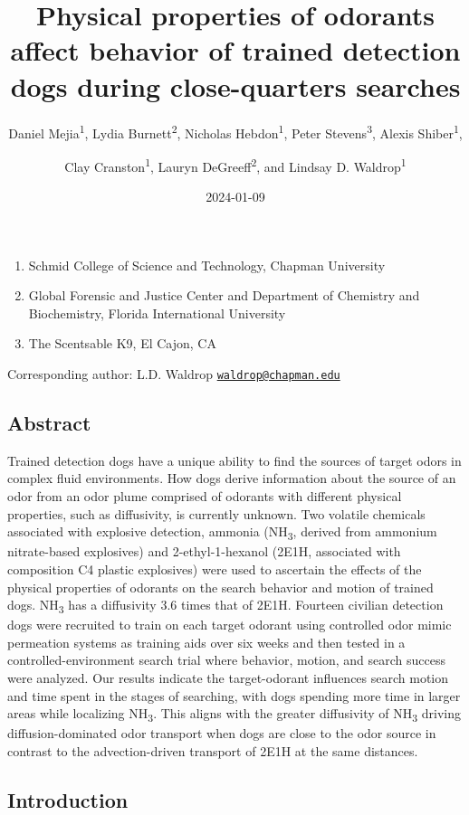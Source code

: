 \documentclass[
]{article}
\title{Physical properties of odorants affect behavior of trained detection dogs during close-quarters searches}
\author{Daniel Mejia\textsuperscript{1}, Lydia Burnett\textsuperscript{2}, Nicholas Hebdon\textsuperscript{1}, Peter Stevens\textsuperscript{3}, Alexis Shiber\textsuperscript{1}, \and Clay Cranston\textsuperscript{1}, Lauryn DeGreeff\textsuperscript{2}, and Lindsay D. Waldrop\textsuperscript{1}}
\date{2024-01-09}
\providecommand{\tightlist}{%
  \setlength{\itemsep}{0pt}\setlength{\parskip}{0pt}}
\begin{document}
\maketitle

\begin{enumerate}
\def\labelenumi{\arabic{enumi}.}
\tightlist
\item
  Schmid College of Science and Technology, Chapman University
\item
  Global Forensic and Justice Center and Department of Chemistry and Biochemistry, Florida International University
\item
  The Scentsable K9, El Cajon, CA
\end{enumerate}

Corresponding author: L.D. Waldrop \href{mailto:waldrop@chapman.edu}{\nolinkurl{waldrop@chapman.edu}}

\hypertarget{abstract}{%
\subsection{Abstract}\label{abstract}}

Trained detection dogs have a unique ability to find the sources of target odors in complex fluid environments. How dogs derive information about the source of an odor from an odor plume comprised of odorants with different physical properties, such as diffusivity, is currently unknown. Two volatile chemicals associated with explosive detection, ammonia (NH\textsubscript{3}, derived from ammonium nitrate-based explosives) and 2-ethyl-1-hexanol (2E1H, associated with composition C4 plastic explosives) were used to ascertain the effects of the physical properties of odorants on the search behavior and motion of trained dogs. NH\textsubscript{3} has a diffusivity 3.6 times that of 2E1H. Fourteen civilian detection dogs were recruited to train on each target odorant using controlled odor mimic permeation systems as training aids over six weeks and then tested in a controlled-environment search trial where behavior, motion, and search success were analyzed. Our results indicate the target-odorant influences search motion and time spent in the stages of searching, with dogs spending more time in larger areas while localizing NH\textsubscript{3}. This aligns with the greater diffusivity of NH\textsubscript{3} driving diffusion-dominated odor transport when dogs are close to the odor source in contrast to the advection-driven transport of 2E1H at the same distances.

\hypertarget{introduction}{%
\subsection{Introduction}\label{introduction}}
\end{document}

